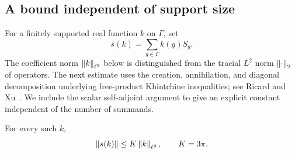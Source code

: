 \subsection{A bound independent of support size}
For a finitely supported real function $k$ on $\Gamma$, set
\[
 s(k)=\sum_{g\in\Gamma}k(g)S_g.
\]
The coefficient norm $\left\lVert k\right\rVert_{\ell^2}$ below is distinguished from the tracial $L^2$ norm $\left\lVert \cdot\right\rVert_2$ of operators.
The next estimate uses the creation, annihilation, and diagonal decomposition
underlying free-product Khintchine inequalities; see Ricard and
Xu~\cite[Section~2, Lemmas~2.1--2.3 and Corollary~2.4]{ricard_xu2006}.
We include the scalar self-adjoint argument to give an explicit constant
independent of the number of summands.
\begin{lemma}\label{lem:free-sum}
For every such $k$,
\begin{equation}\label{eq:free-sum}
 \left\lVert s(k)\right\rVert\leq K\left\lVert k\right\rVert_{\ell^2},\qquad K=3\pi.
\end{equation}
\end{lemma}
